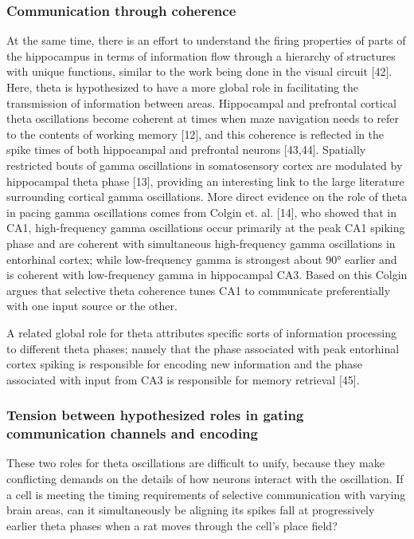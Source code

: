 \documentclass[]{article}
\begin{document}
\subsubsection{Communication through coherence}

At the same time, there is an effort to understand the firing properties
of parts of the hippocampus in terms of information flow through a
hierarchy of structures with unique functions, similar to the work being
done in the visual circuit {[}42{]}. Here, theta is hypothesized to have
a more global role in facilitating the transmission of information
between areas. Hippocampal and prefrontal cortical theta oscillations
become coherent at times when maze navigation needs to refer to the
contents of working memory {[}12{]}, and this coherence is reflected in
the spike times of both hippocampal and prefrontal neurons {[}43,44{]}.
Spatially restricted bouts of gamma oscillations in somatosensory cortex
are modulated by hippocampal theta phase {[}13{]}, providing an
interesting link to the large literature surrounding cortical gamma
oscillations. More direct evidence on the role of theta in pacing gamma
oscillations comes from Colgin et. al. {[}14{]}, who showed that in CA1,
high-frequency gamma oscillations occur primarily at the peak CA1
spiking phase and are coherent with simultaneous high-frequency gamma
oscillations in entorhinal cortex; while low-frequency gamma is
strongest about 90° earlier and is coherent with low-frequency gamma in
hippocampal CA3. Based on this Colgin argues that selective theta
coherence tunes CA1 to communicate preferentially with one input source
or the other.

A related global role for theta attributes specific sorts of information
processing to different theta phases; namely that the phase associated
with peak entorhinal cortex spiking is responsible for encoding new
information and the phase associated with input from CA3 is responsible
for memory retrieval {[}45{]}.

\subsubsection{Tension between hypothesized roles in gating
communication channels and encoding}

These two roles for theta oscillations are difficult to unify, because
they make conflicting demands on the details of how neurons interact
with the oscillation. If a cell is meeting the timing requirements of
selective communication with varying brain areas, can it simultaneously
be aligning its spikes fall at progressively earlier theta phases when a
rat moves through the cell's place field?
\end{document}
